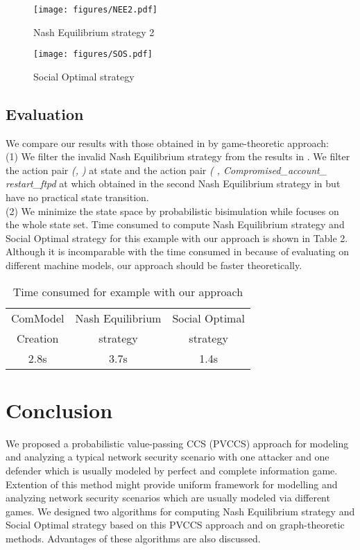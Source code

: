 \documentclass{acm_proc_article-sp}
\begin{document}
\begin{figure}[!htb]
\begin{center}
\texttt{[image: figures/NEE2.pdf]}
\caption{Nash Equilibrium strategy 2}
\label{nash2}
\end{center}
\end{figure}

\begin{figure}[!htb]
\begin{center}
\texttt{[image: figures/SOS.pdf]}
\caption{Social Optimal strategy}
\label{sos}
\end{center}
\end{figure}

\subsection{Evaluation}
We compare our results with those obtained in \cite{klye} by game-theoretic approach: \\
(1) We filter the invalid Nash Equilibrium strategy from the results in \cite{klye}. We filter the action pair \textit{(,   )} at state  and the action pair \textit{(  , Compromised\_account\_ restart\_\textit{ftpd}} at  which obtained in the second Nash Equilibrium strategy in \cite{klye} but have no practical state transition.\\
(2) We minimize the state space by probabilistic bisimulation while   \cite{klye} focuses on the whole state set. Time consumed to compute Nash Equilibrium strategy and Social Optimal strategy for this example with our approach is shown in Table 2. Although it is incomparable with the time consumed in \cite{klye} because of evaluating on different machine models, our approach should be faster theoretically.

\begin{table}[htpd]
\centering
\scriptsize
\label{comsume}
\begin{tabular}{ccc}\hline
ComModel& Nash Equilibrium & Social Optimal\\
Creation &  strategy &  strategy \\\hline
2.8s & 3.7s & 1.4s\\\hline
\end{tabular}
\caption{Time consumed for example with our approach}
\end{table}

\section{Conclusion}
We proposed a probabilistic value-passing CCS (PVCCS) approach for modeling and analyzing a typical network security scenario with one attacker and one defender which is usually modeled by perfect and complete information game.
Extention of this method might provide uniform framework for modelling and analyzing network security scenarios which are usually modeled via different games.
We designed two algorithms for computing Nash Equilibrium strategy and Social Optimal strategy based on this PVCCS approach and on graph-theoretic methods. Advantages of these algorithms are also discussed.
\end{document}
